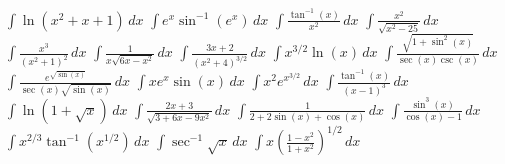 \documentclass{article}
\begin{document}
\begin{tasks}[label=\arabic*., label-width=18pt]
  \task \( \displaystyle \int \ln(x^2 + x + 1) \, dx \)
  \task \( \displaystyle \int e^x \sin^{-1}(e^x) \, dx \)
  \task \( \displaystyle \int \frac{\tan^{-1}(x)}{x^2} \, dx \)
  \task \( \displaystyle \int \frac{x^2}{\sqrt{x^2 - 25}} \, dx \)
  \task \( \displaystyle \int \frac{x^3}{(x^2 + 1)^2} \, dx \)
  \task \( \displaystyle \int \frac{1}{x \sqrt{6x - x^2}} \, dx \)
  \task \( \displaystyle \int \frac{3x + 2}{(x^2 + 4)^{3/2}} \, dx \)
  \task \( \displaystyle \int x^{3/2} \ln(x) \, dx \)
  \task \( \displaystyle \int \frac{\sqrt{1 + \sin^2(x)}}{\sec(x) \csc(x)} \, dx \)
  \task \( \displaystyle \int \frac{e^{\sqrt{\sin(x)}}}{\sec(x) \sqrt{\sin(x)}} \, dx \)
  \task \( \displaystyle \int x e^x \sin(x) \, dx \)
  \task \( \displaystyle \int x^2 e^{x^{3/2}} \, dx \)
  \task \( \displaystyle \int \frac{\tan^{-1}(x)}{(x - 1)^3} \, dx \)
  \task \( \displaystyle \int \ln(1 + \sqrt{x}) \, dx \)
  \task \( \displaystyle \int \frac{2x + 3}{\sqrt{3 + 6x - 9x^2}} \, dx \)
  \task \( \displaystyle \int \frac{1}{2 + 2 \sin(x) + \cos(x)} \, dx \)
  \task \( \displaystyle \int \frac{\sin^3(x)}{\cos(x) - 1} \, dx \)
  \task \( \displaystyle \int x^{2/3} \tan^{-1}(x^{1/2}) \, dx \)
  \task \( \displaystyle \int \sec^{-1}{\sqrt{x}} \, dx \)
  \task \( \displaystyle \int x \left( \frac{1 - x^2}{1 + x^2} \right)^{1/2} \, dx \)
\end{tasks}
\end{document}
